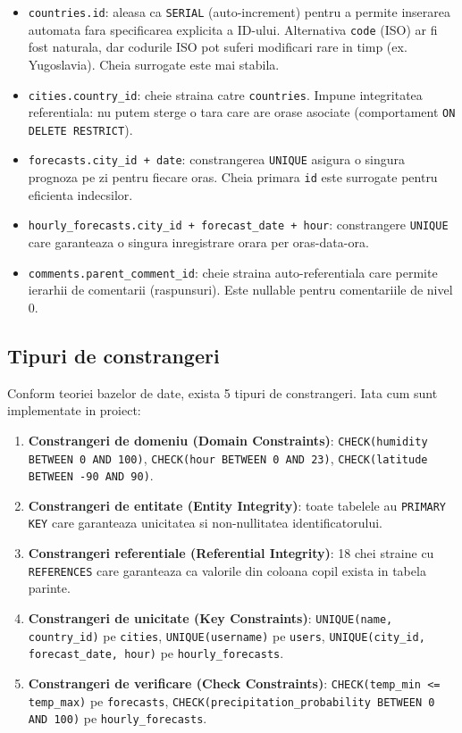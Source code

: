 \documentclass[12pt,a4paper]{article}
\begin{document}
\begin{itemize}
    \item \texttt{countries.id}: aleasa ca \texttt{SERIAL} (auto-increment) pentru a permite inserarea automata fara specificarea explicita a ID-ului. Alternativa \texttt{code} (ISO) ar fi fost naturala, dar codurile ISO pot suferi modificari rare in timp (ex. Yugoslavia). Cheia surrogate este mai stabila.
    \item \texttt{cities.country\_id}: cheie straina catre \texttt{countries}. Impune integritatea referentiala: nu putem sterge o tara care are orase asociate (comportament \texttt{ON DELETE RESTRICT}).
    \item \texttt{forecasts.city\_id + date}: constrangerea \texttt{UNIQUE} asigura o singura prognoza pe zi pentru fiecare oras. Cheia primara \texttt{id} este surrogate pentru eficienta indecsilor.
    \item \texttt{hourly\_forecasts.city\_id + forecast\_date + hour}: constrangere \texttt{UNIQUE} care garanteaza o singura inregistrare orara per oras-data-ora.
    \item \texttt{comments.parent\_comment\_id}: cheie straina auto-referentiala care permite ierarhii de comentarii (raspunsuri). Este nullable pentru comentariile de nivel 0.
\end{itemize}

\subsection{Tipuri de constrangeri}

Conform teoriei bazelor de date, exista 5 tipuri de constrangeri. Iata cum sunt implementate in proiect:

\begin{enumerate}
    \item \textbf{Constrangeri de domeniu (Domain Constraints)}: \texttt{CHECK(humidity BETWEEN 0 AND 100)}, \texttt{CHECK(hour BETWEEN 0 AND 23)}, \texttt{CHECK(latitude BETWEEN -90 AND 90)}.
    \item \textbf{Constrangeri de entitate (Entity Integrity)}: toate tabelele au \texttt{PRIMARY KEY} care garanteaza unicitatea si non-nullitatea identificatorului.
    \item \textbf{Constrangeri referentiale (Referential Integrity)}: 18 chei straine cu \texttt{REFERENCES} care garanteaza ca valorile din coloana copil exista in tabela parinte.
    \item \textbf{Constrangeri de unicitate (Key Constraints)}: \texttt{UNIQUE(name, country\_id)} pe \texttt{cities}, \texttt{UNIQUE(username)} pe \texttt{users}, \texttt{UNIQUE(city\_id, forecast\_date, hour)} pe \texttt{hourly\_forecasts}.
    \item \textbf{Constrangeri de verificare (Check Constraints)}: \texttt{CHECK(temp\_min <= temp\_max)} pe \texttt{forecasts}, \texttt{CHECK(precipitation\_probability BETWEEN 0 AND 100)} pe \texttt{hourly\_forecasts}.
\end{enumerate}
\end{document}

